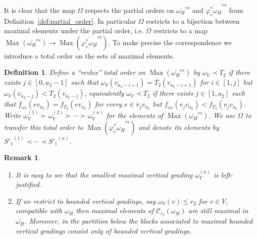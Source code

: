 \documentclass{amsart}
\newtheorem{definition}[theorem]{Definition}
\newtheorem{remark}[theorem]{Remark}
\newcommand{\cC}{\mathcal{C}}
\newcommand{\Max}{\operatorname{Max}}
\newenvironment{enumeratea}{\begin{enumerate}[\upshape (a)]}
                           {\end{enumerate}}
\begin{document}
 It is clear that the map $\Omega$ respects the partial orders on $\overline{\omega_H}^{rs}$ and $\overline{\varphi_r^*\omega_H}^{rs}$ from Definition~\ref{def:partial_order}.  In particular $\Omega$ restricts to a bijection between maximal elements under the partial order, i.e. $\Omega$ restricts to a map $\Max(\overline{\omega_H}^{rs})\to\Max(\overline{\varphi_r^*\omega_H}^{rs})$.  To make precise the correspondence we introduce a total order on the sets of maximal elements.
 \begin{definition}
  Define a ``revlex'' total order on $\Max(\overline{\omega_H}^{rs})$ by $\omega_V\prec T_2$ if there exists $j\in[0,a_2-1]$ such that $\omega_V(v_{a_2-i+1})=T_2(v_{a_2-i+1})$ for $i\in[1,j]$ but $\omega_V(v_{a_2-j})<T_2(v_{a_2-j})$, equivalently $\omega_V\prec T_2$ if there exists $j\in[1,a_2]$ such that $f_{\omega_V}(ev_{a_2})=f_{T_2}(ev_{a_2})$ for every $e\in\overline{v}_jv_{a_2}$ but $f_{\omega_V}(v_jv_{a_2})<f_{T_2}(v_jv_{a_2})$.  Write $\omega_V^{(1)}\succ \omega_V^{(2)}\succ\cdots\succ \omega_V^{(n)}$ for the elements of $\Max(\overline{\omega_H}^{rs})$.  We use $\Omega$ to transfer this total order to $\Max(\overline{\varphi_r^*\omega_H}^{rs})$ and denote its elements by ${S'_1}^{(1)}\prec\cdots\prec {S'_1}^{(n)}$.
 \end{definition}
 \begin{remark}\mbox{}
  \begin{enumeratea}
   \item It is easy to see that the smallest maximal vertical grading $\omega_V^{(n)}$ is left-justified.
   \item If we restrict to bounded vertical gradings, say $\omega_V(v)\le r_2$ for $v\in V$, compatible with $\omega_H$ then maximal elements of $\cC_{r_2}(\omega_H)$ are still maximal in $\overline{\omega_H}$.  Moreover, in the partition below the blocks associated to maximal bounded vertical gradings consist only of bounded vertical gradings.
  \end{enumeratea}
 \end{remark} 
\end{document}
